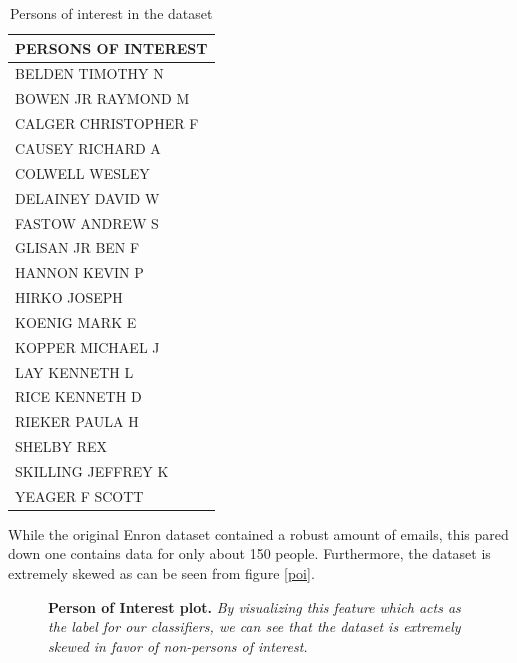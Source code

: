 \documentclass[twoside,openright,titlepage,numbers=noenddot,headinclude,%
               footinclude=true,cleardoublepage=empty,abstractoff,BCOR=5mm,%
               paper=a4,fontsize=11pt,ngerman,american]{scrreprt}
\numberwithin{theorem}{chapter}
\numberwithin{definition}{chapter}
\numberwithin{algorithm}{chapter}
\numberwithin{figure}{chapter}
\numberwithin{table}{chapter}
\numberwithin{equation}{chapter}
\begin{document}
\begin{table}[!htbp]
  \begin{center}
    \begin{tabular}{ |p{8cm}| } 
    \hline
    PERSONS OF INTEREST                \\ 

    \hline
    BELDEN TIMOTHY N    \\ 
    BOWEN JR RAYMOND M  \\ 
    CALGER CHRISTOPHER F\\ 
    CAUSEY RICHARD A    \\ 
    COLWELL WESLEY      \\ 
    DELAINEY DAVID W    \\ 
    FASTOW ANDREW S     \\ 
    GLISAN JR BEN F     \\ 
    HANNON KEVIN P      \\ 
    HIRKO JOSEPH        \\ 
    KOENIG MARK E       \\ 
    KOPPER MICHAEL J    \\ 
    LAY KENNETH L       \\ 
    RICE KENNETH D      \\ 
    RIEKER PAULA H      \\ 
    SHELBY REX          \\ 
    SKILLING JEFFREY K  \\ 
    YEAGER F SCOTT      \\ 
    \hline
    \end{tabular}
    \caption{Persons of interest in the dataset}
    \label{poiTable}
  \end{center}
\end{table}
While the original Enron dataset contained a robust amount of emails, this pared down one contains data for only about 150 people. Furthermore, the dataset is extremely skewed as can be seen from figure \ref{poi}.

\begin{figure}[!hbtp]
\centering
    
    \caption{\textbf{Person of Interest plot.}\textit{ By visualizing this feature which acts as the label for our classifiers, we can see that the dataset is extremely skewed in favor of non-persons of interest.}}
\end{figure}
\end{document}
